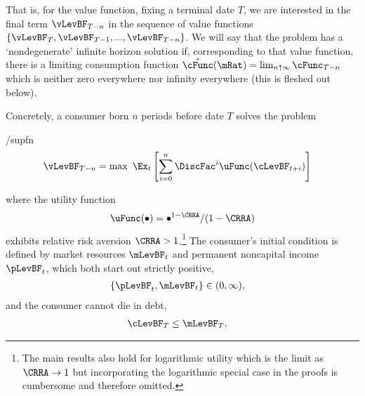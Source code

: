 \documentclass[BufferStockTheory]{subfiles}
\begin{document}
That is, for the value function, fixing a terminal date $T$,  we are interested in the final term $\vLevBF_{T-n}$ in the sequence of value functions $\{\vLevBF_{T},\vLevBF_{T-1},...,\vLevBF_{T-n}\}$.  We will say that the problem has a `nondegenerate' infinite horizon solution if, corresponding to that value function, there is a limiting consumption function $\mathring{\cFunc}(\mRat) = \lim_{n \uparrow \infty} \cFunc_{T-n}$ which is neither zero everywhere nor infinity everywhere (this is fleshed out below).

Concretely, a consumer born $n$ periods before date $T$ solves the problem
\begin{verbatimwrite}{\EqDir/supfn}
  \begin{align*}%
    \vLevBF_{T-n} & = \max~ \Ex_{t}\left[\sum_{i=0}^{n} \DiscFac^{i} \uFunc(\cLevBF_{t+i})\right]
  \end{align*}
\end{verbatimwrite}

where the utility function
\begin{align}
  \uFunc(\bullet)=\bullet^{1-\CRRA}/(1-\CRRA) \label{eq:crrautil}
\end{align}
exhibits relative risk aversion $\CRRA > 1$.\footnote{The main
  results also hold for logarithmic utility which is the limit as
  $\CRRA \rightarrow 1$ but incorporating the logarithmic special case
  in the proofs is cumbersome and therefore
  omitted.}  The consumer's initial condition is
defined by market resources $\mLevBF_{t}$ and permanent noncapital income $\pLevBF_{t}$, which
both start out strictly positive,
\begin{align}
  \{\pLevBF_{t},\mLevBF_{t}\} & \in (0,\infty) \label{eq:pLevBFandmLevBFgt0},
\end{align}
and the consumer cannot die in debt,
\begin{align}
  \cLevBF_{T} & \leq  \mLevBF_{T} \label{eq:NoDebtAtDeath}.
\end{align}
\end{document}

